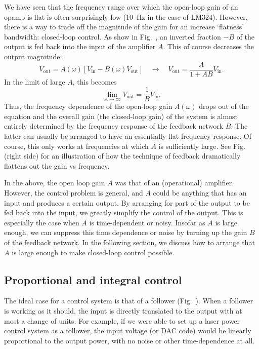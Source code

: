 We have seen that the frequency range over which the open-loop gain of an opamp
is flat is often surprisingly low (10~Hz in the case of LM324). However, there
is a way to trade off the magnitude of the gain for an increase `flatness'
bandwidth: closed-loop control. As show in Fig.~, an inverted
fraction $-B$ of the output is fed back into the input of the amplifier $A$.
This of course decreases the output magnitude:
%
\[
   V_\text{out}=A(\omega)\left[V_\text{in}-B(\omega)V_\text{out}\right]
   \quad\to\quad
   V_\text{out}=\frac{A}{1+AB}V_\text{in}.
\]
%
In the limit of large $A$, this becomes
%
\[
   \lim_{A\to\infty}V_\text{out}=\frac{1}{B}V_\text{in}.
\]
%
Thus, the frequency dependence of the open-loop gain $A(\omega)$ drops out of
the equation and the overall gain (the closed-loop gain) of the system is almost
entirely determined by the frequency response of the feedback network $B$. The
latter can usually be arranged to have an essentially flat frequency response.
Of course, this only works at frequencies at which $A$ is sufficiently large.
See Fig.~ (right side) for an illustration of how the technique of
feedback dramatically flattens out the gain vs frequency.

In the above, the open loop gain $A$ was that of an (operational) amplifier.
However, the control problem is general, and $A$ could be anything that has an
input and produces a certain output. By arranging for part of the output to be
fed back into the input, we greatly simplify the control of the output. This is
especially the case when $A$ is time-dependent or noisy. Insofar as $A$ is large
enough, we can suppress this time dependence or noise by turning up the gain $B$
of the feedback network. In the following section, we discuss how to arrange that
$A$ is large enough to make closed-loop control possible.

\subsection{Proportional and integral control}

The ideal case for a control system is that of a follower (Fig.~).
When a follower is working as it should, the input is directly translated to the
output with at most a change of units. For example, if we were able to set up a
laser power control system as a follower, the input voltage (or DAC code) would
be linearly proportional to the output power, with no noise or other
time-dependence at all.


